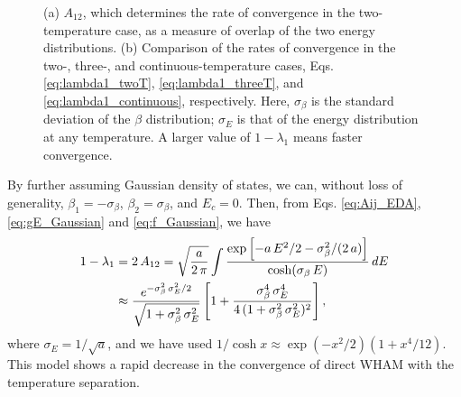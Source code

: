 \documentclass[aip,jcp,preprint,superscriptaddress]{revtex4-1}
\begin{document}
\begin{figure}[h]
  \caption{\label{fig:gausconv}
    (a) $A_{12}$,
    which determines the rate of convergence
    in the two-temperature case,
    as a measure of overlap
    of the two energy distributions.
    (b) Comparison of the rates of convergence
    in the two-, three-,
    and continuous-temperature cases,
    Eqs. \eqref{eq:lambda1_twoT},
    \eqref{eq:lambda1_threeT},
    and
    \eqref{eq:lambda1_continuous},
    respectively.
    Here,
    $\sigma_\beta$
    is the standard deviation of the $\beta$ distribution;
    $\sigma_E$
    is that of the energy distribution
    at any temperature.
    A larger value of $1 - \lambda_1$
    means faster convergence.
  }
\end{figure}



By further assuming Gaussian density of states,
we can, without loss of generality,
$\beta_1 = -\sigma_\beta$,
$\beta_2 = \sigma_\beta$,
and $E_c = 0$.
%
Then, from
Eqs. \eqref{eq:Aij_EDA},
\eqref{eq:gE_Gaussian}
and \eqref{eq:f_Gaussian},
we have
%
\begin{align}
1 - \lambda_1
&= 2 \, A_{12}
=
\sqrt \frac{ a } { 2 \, \pi }
\int
\frac
{
  \exp\left[
    -a \, E^2/2
    -\sigma_\beta^2 / (2 \, a)
  \right]
}
{ \cosh( \sigma_\beta \, E ) }
\, dE
\notag \\
%
&\approx\frac{ e^{-\sigma_\beta^2 \, \sigma_E^2/2} }
{ \sqrt{ 1 + \sigma_\beta^2 \, \sigma_E^2 } }
\left[
  1 + \frac{ \sigma_\beta^4 \, \sigma_E^4 }
  {4\,(1 + \sigma_\beta^2 \, \sigma_E^2)^2 }
\right],
\label{eq:lambda1_twoT}
\end{align}
%
where
$\sigma_E = 1/\sqrt{a}$,
%
and we have used
$1/\cosh x \approx \exp(-x^2/2)(1 + x^4/12)$.
%
This model shows
a rapid decrease in
the convergence of direct WHAM
with the temperature separation.
\end{document}
